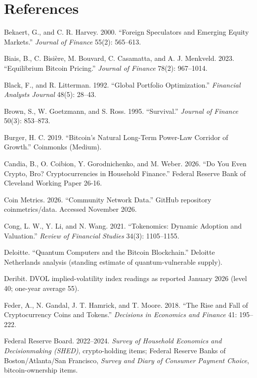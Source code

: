 \documentclass[11pt]{article}
\begin{document}
\section*{References}
\begin{list}{}{\setlength{\itemindent}{-1.5em}\setlength{\leftmargin}{1.5em}\setlength{\itemsep}{2pt}\setlength{\parsep}{0pt}}
\item Bekaert, G., and C. R. Harvey. 2000. ``Foreign Speculators and Emerging Equity Markets.'' \emph{Journal of Finance} 55(2): 565--613.
\item Biais, B., C. Bisi\`ere, M. Bouvard, C. Casamatta, and A. J. Menkveld. 2023. ``Equilibrium Bitcoin Pricing.'' \emph{Journal of Finance} 78(2): 967--1014.
\item Black, F., and R. Litterman. 1992. ``Global Portfolio Optimization.'' \emph{Financial Analysts Journal} 48(5): 28--43.
\item Brown, S., W. Goetzmann, and S. Ross. 1995. ``Survival.'' \emph{Journal of Finance} 50(3): 853--873.
\item Burger, H. C. 2019. ``Bitcoin's Natural Long-Term Power-Law Corridor of Growth.'' Coinmonks (Medium).
\item Candia, B., O. Coibion, Y. Gorodnichenko, and M. Weber. 2026. ``Do You Even Crypto, Bro? Cryptocurrencies in Household Finance.'' Federal Reserve Bank of Cleveland Working Paper 26-16.
\item Coin Metrics. 2026. ``Community Network Data.'' GitHub repository coinmetrics/data. Accessed November 2026.
\item Cong, L. W., Y. Li, and N. Wang. 2021. ``Tokenomics: Dynamic Adoption and Valuation.'' \emph{Review of Financial Studies} 34(3): 1105--1155.
\item Deloitte. ``Quantum Computers and the Bitcoin Blockchain.'' Deloitte Netherlands analysis (standing estimate of quantum-vulnerable supply).
\item Deribit. DVOL implied-volatility index readings as reported January 2026 (level 40; one-year average 55).
\item Feder, A., N. Gandal, J. T. Hamrick, and T. Moore. 2018. ``The Rise and Fall of Cryptocurrency Coins and Tokens.'' \emph{Decisions in Economics and Finance} 41: 195--222.
\item Federal Reserve Board. 2022--2024. \emph{Survey of Household Economics and Decisionmaking (SHED)}, crypto-holding items; Federal Reserve Banks of Boston/Atlanta/San Francisco, \emph{Survey and Diary of Consumer Payment Choice}, bitcoin-ownership items.

\end{list}
\end{document}
